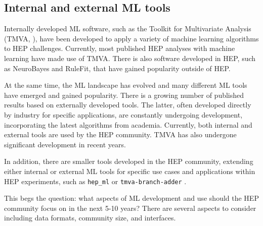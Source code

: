 \subsection{Internal and external ML tools}


Internally developed ML software, such as the Toolkit for Multivariate Analysis (TMVA, \cite{TMVA}), have been developed to apply a variety of machine learning algorithms to HEP challenges. Currently, most published HEP analyses with machine learning have made use of TMVA. There is also software developed in HEP, such as NeuroBayes\cite{neurobayes,neurobayes2} and RuleFit, that have gained popularity outside of HEP.

At the same time, the ML landscape has evolved and many different ML tools have emerged and gained popularity. There is a growing number of published results based on externally developed tools. The latter, often developed directly by industry for specific applications, are constantly undergoing development, incorporating the latest algorithms from academia. Currently, both internal and external tools are used by the HEP community. TMVA has also undergone significant development in recent years.

In addition, there are smaller tools developed in the HEP community, extending either internal or external ML tools for specific use cases and applications within HEP experiments, such as \texttt{hep\_ml} \cite{hep_ml} or \texttt{tmva-branch-adder} \cite{tmva-branch-adder}.

This begs the question: what aspects of ML development and use should the HEP community focus on in the next 5-10 years? There are several aspects to consider including data formats, community size, and interfaces.

